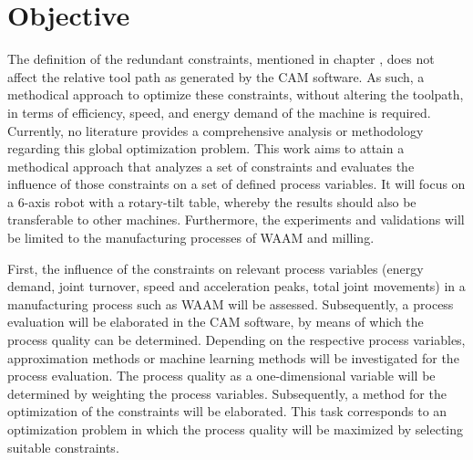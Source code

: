 \section{Objective}%
The definition of the redundant constraints, mentioned in chapter , does not affect the relative tool path as generated by the CAM software. As such, a methodical approach to optimize these constraints, without altering the toolpath, in terms of efficiency, speed, and energy demand of the machine is required. Currently, no literature provides a comprehensive analysis or methodology regarding this global optimization problem.
This work aims to attain a methodical approach that analyzes a set of constraints and evaluates the influence of those constraints on a set of defined process variables. It will focus on a 6-axis robot with a rotary-tilt table, whereby the results should also be transferable to other machines. Furthermore, the experiments and validations will be limited to the manufacturing processes of WAAM and milling. 


First, the influence of the constraints on relevant process variables (energy demand, joint turnover, speed and acceleration peaks, total joint movements) in a manufacturing process such as WAAM will be assessed. Subsequently, a process evaluation will be elaborated in the CAM software, by means of which the process quality can be determined. Depending on the respective process variables, approximation methods or machine learning methods will be investigated for the process evaluation. The process quality as a one-dimensional variable will be determined by weighting the process variables. Subsequently, a method for the optimization of the constraints will be elaborated. This task corresponds to an optimization problem in which the process quality will be maximized by selecting suitable constraints. 
